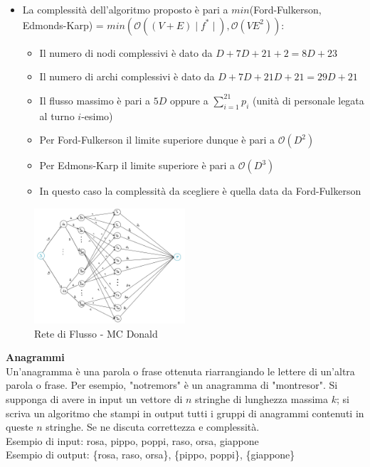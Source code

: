 \documentclass[../cheatSheetAlgoritmi.tex]{subfiles}
\begin{document}
\begin{itemize}
\begin{itemize}
	\end{itemize}
	\item La complessità dell'algoritmo proposto è pari a $min$(Ford-Fulkerson, Edmonds-Karp) = $min(\mathcal{O}((V + E) \mid f^{*} \mid), \mathcal{O}(VE^{2}))$:
		\begin{itemize}
			\item Il numero di nodi complessivi è dato da $D + 7D + 21 + 2 = 8D + 23$
			\item Il numero di archi complessivi è dato da $D + 7D + 21D + 21 = 29D + 21$
			\item Il flusso massimo è pari a $5D$ oppure a $\sum_{i = 1}^{21}p_{i}$ (unità di personale legata al turno $i$-esimo)
			\item Per Ford-Fulkerson il limite superiore dunque è pari a $\mathcal{O}(D^{2})$
			\item Per Edmons-Karp il limite superiore è pari a $\mathcal{O}(D^{3})$
			\item In questo caso la complessità da scegliere è quella data da Ford-Fulkerson\\
		\end{itemize}
\end{itemize}
\begin{figure}[h]
\caption{Rete di Flusso - MC Donald}
\centering
\includegraphics[width=0.5\textwidth]{../img/Locale_3.jpg}
\end{figure}
\textbf{Anagrammi}\\
Un'anagramma è una parola o frase ottenuta riarrangiando le lettere di un'altra parola o frase. Per esempio, "notremors" è un anagramma di "montresor". Si supponga di avere in input un vettore di $n$ stringhe di lunghezza massima $k$; si scriva un algoritmo che stampi in output tutti i gruppi di anagrammi contenuti in queste $n$ stringhe. Se ne discuta correttezza e complessità.\\
Esempio di input: rosa, pippo, poppi, raso, orsa, giappone\\
Esempio di output: \{rosa, raso, orsa\}, \{pippo, poppi\}, \{giappone\}\\
\end{document}
